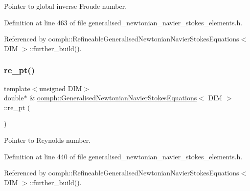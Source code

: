 Pointer to global inverse Froude number. 



Definition at line 463 of file generalised\+\_\+newtonian\+\_\+navier\+\_\+stokes\+\_\+elements.\+h.



Referenced by oomph\+::\+Refineable\+Generalised\+Newtonian\+Navier\+Stokes\+Equations$<$ D\+I\+M $>$\+::further\+\_\+build().

\mbox{\label{classoomph_1_1GeneralisedNewtonianNavierStokesEquations_ab172943aec8d114a81edfd862c7d4afd}} 
\subsubsection{\texorpdfstring{re\+\_\+pt()}{re\_pt()}}
{\footnotesize\ttfamily template$<$unsigned D\+IM$>$ \\
double$\ast$ \& \hyperlink{classoomph_1_1GeneralisedNewtonianNavierStokesEquations}{oomph\+::\+Generalised\+Newtonian\+Navier\+Stokes\+Equations}$<$ D\+IM $>$\+::re\+\_\+pt (\begin{DoxyParamCaption}{ }\end{DoxyParamCaption})\hspace{0.3cm}{\ttfamily [inline]}}



Pointer to Reynolds number. 



Definition at line 440 of file generalised\+\_\+newtonian\+\_\+navier\+\_\+stokes\+\_\+elements.\+h.



Referenced by oomph\+::\+Refineable\+Generalised\+Newtonian\+Navier\+Stokes\+Equations$<$ D\+I\+M $>$\+::further\+\_\+build().

\mbox{\label{classoomph_1_1GeneralisedNewtonianNavierStokesEquations_ae34dc7d7205f341405f90a26e92ba327}} 
